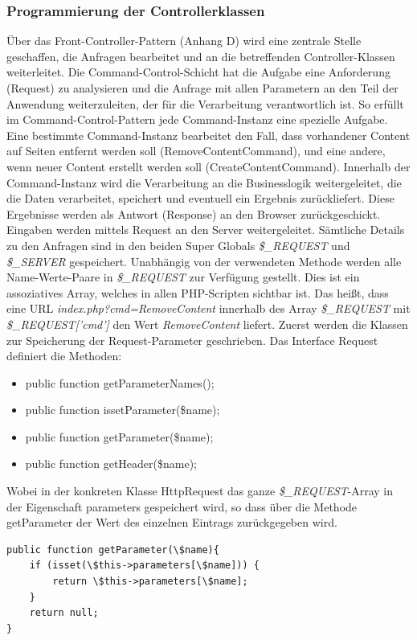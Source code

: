 \documentclass[10.5pt]{scrarticle}
\begin{document}
\subsubsection{Programmierung der Controllerklassen}

Über das Front-Controller-Pattern (Anhang D) wird eine zentrale Stelle geschaffen, die Anfragen bearbeitet und an die betreffenden Controller-Klassen weiterleitet.  
Die Command-Control-Schicht hat die Aufgabe eine Anforderung (Request) zu analysieren und die Anfrage mit allen Parametern an den Teil der Anwendung weiterzuleiten, der für die Verarbeitung verantwortlich ist. So erfüllt im Command-Control-Pattern jede Command-Instanz eine spezielle Aufgabe. Eine bestimmte Command-Instanz bearbeitet den Fall, dass vorhandener Content auf Seiten entfernt werden soll (RemoveContentCommand), und eine andere, wenn neuer Content erstellt werden soll (CreateContentCommand).  
Innerhalb der Command-Instanz wird die Verarbeitung an die Businesslogik weitergeleitet, die die Daten verarbeitet, speichert und eventuell ein Ergebnis zurückliefert. Diese Ergebnisse werden als Antwort (Response) an den Browser zurückgeschickt.  
Eingaben werden mittels Request an den Server weitergeleitet. Sämtliche Details zu den Anfragen sind in den beiden Super Globals \textit{\$\_REQUEST} und \textit{\$\_SERVER} gespeichert. Unabhängig von der verwendeten Methode werden alle Name-Werte-Paare in \textit{\$\_REQUEST} zur Verfügung gestellt. Dies ist ein assoziatives Array, welches in allen PHP-Scripten sichtbar ist. Das heißt, dass eine URL \textit{index.php?cmd=RemoveContent} innerhalb des Array \textit{\$\_REQUEST} mit \textit{\$\_REQUEST['cmd']} den Wert \textit{RemoveContent} liefert. 
Zuerst werden die Klassen zur Speicherung der Request-Parameter geschrieben.  
Das Interface Request definiert die Methoden:
\begin{itemize}
    \item public function getParameterNames();
	\item public function issetParameter(\$name);
	\item public function getParameter(\$name);
	\item public function getHeader(\$name);
\end{itemize}
Wobei in der konkreten Klasse HttpRequest das ganze \textit{\$\_REQUEST}-Array in der Eigenschaft parameters gespeichert wird, so dass über die Methode getParameter der Wert des einzelnen Eintrags zurückgegeben wird.

\lstset{firstnumber=1}
\begin{lstlisting}
public function getParameter(\$name){
    if (isset(\$this->parameters[\$name])) {
        return \$this->parameters[\$name];
    }
    return null;
} 
\end{lstlisting}
\end{document}
